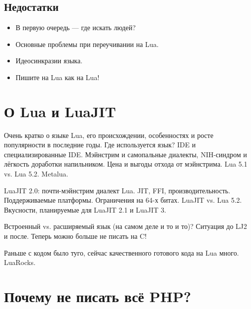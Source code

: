 \documentclass[handout]{beamer}
\begin{document}
\subsection*{Недостатки}

\begin{frame}
  \begin{itemize}
    \item В первую очередь — где искать людей?
    \item Основные проблемы при переучивании на Lua.
    \item Идеосинкразии языка.
    \item Пишите на Lua как на Lua!
  \end{itemize}
\end{frame}


\section{О Lua и LuaJIT}

\begin{frame}
  Очень кратко о языке Lua, его происхождении, особенностях и росте популярности в последние годы. Где используется язык? IDE и специализированные IDE. Мэйнстрим и самопальные диалекты, NIH-синдром и лёгкость доработки напильником. Цена и выгоды отхода от мэйнстрима. Lua 5.1 vs. Lua 5.2. Metalua.
\end{frame}

\begin{frame}
  LuaJIT 2.0: почти-мэйнстрим диалект Lua. JIT, FFI, производительность. Поддерживаемые платформы. Ограничения на 64-х битах. LuaJIT vs. Lua 5.2. Вкусности, планируемые для LuaJIT 2.1 и LuaJIT 3.
\end{frame}

\begin{frame}
  Встроенный vs. расширяемый язык (на самом деле и то и то)? Ситуация до LJ2 и после. Теперь можно больше не писать на C!
\end{frame}

\begin{frame}
  Раньше с кодом было туго, сейчас качественного готового кода на Lua много. LuaRocks.
\end{frame}


\section{Почему не писать всё PHP?}
\end{document}

